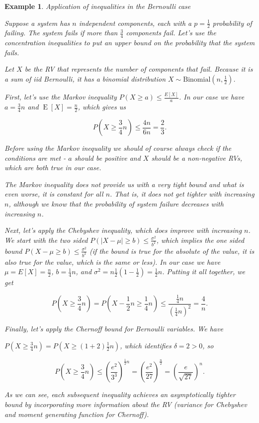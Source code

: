 \documentclass{book}
\theoremstyle{plain}%
\newtheorem{prototheorem}{Example}[section]
\newenvironment{cexample}
   {\colorlet{shadecolor}{gray!10}\begin{shaded}\begin{prototheorem}}
   {\end{prototheorem}\end{shaded}}
\theoremstyle{definition}
\DeclareMathOperator{\E}{E}
\begin{document}
\begin{cexample}{Application of inequalities in the Bernoulli case}

Suppose a system has $n$ independent components, each with a $p = \frac{1}{2}$ probability of failing. The system fails if more than $\frac{3}{4}$ components fail. Let's use the concentration inequalities to put an upper bound on the probability that the system fails.

Let $X$ be the RV that represents the number of components that fail. Because it is a sum of iid Bernoulli, it has a binomial distribution $X \sim \text{Binomial}(n, \frac{1}{2})$.

First, let's use the Markov inequality $P(X \geq a) \leq \frac{E[X]}{a}$. In our case we have $a = \frac{3}{4}n$ and $\E[X] = \frac{n}{2}$, which gives us

$$P(X \geq \frac{3}{4}n) \leq \frac{4n}{6n} = \frac{2}{3}.$$

Before using the Markov inequality we should of course always check if the conditions are met - $a$ should be positive and $X$ should be a non-negative RVs, which are both true in our case.

The Markov inequality does not provide us with a very tight bound and what is even worse, it is constant for all $n$. That is, it does not get tighter with increasing $n$, although we know that the probability of system failure decreases with increasing $n$.

Next, let's apply the Chebyshev inequality, which does improve with increasing $n$. We start with the two sided $P(|X - \mu| \geq b) \leq \frac{\sigma^2}{b^2}$, which implies the one sided bound $P(X - \mu \geq b) \leq \frac{\sigma^2}{b^2}$ (if the bound is true for the absolute of the value, it is also true for the value, which is the same or less). In our case we have $\mu = E[X] = \frac{n}{2}$, $b = \frac{1}{4}n$, and $\sigma^2 = n\frac{1}{2}(1 - \frac{1}{2}) = \frac{1}{2}n$. Putting it all together, we get

$$P(X \geq \frac{3}{4}n) = P(X - \frac{1}{2}n \geq \frac{1}{4}n) \leq \frac{\frac{1}{4}n}{(\frac{1}{4}n)^2} = \frac{4}{n}.$$

Finally, let's apply the Chernoff bound for Bernoulli variables. We have

$P(X \geq \frac{3}{4}n) = P(X \geq (1 + 2)\frac{1}{2}n)$, which identifies $\delta = 2 > 0$, so

$$P(X \geq \frac{3}{4}n) \leq \left(\frac{e^2}{3^3}\right)^{\frac{1}{2}n} = \left(\frac{e^2}{27}\right)^{\frac{n}{2}} = \left(\frac{e}{\sqrt{27}}\right)^n.$$

As we can see, each subsequent inequality achieves an asymptotically tighter bound by incorporating more information about the RV (variance for Chebyshev and moment generating function for Chernoff).
\label{ex:ineq_binom}
\end{cexample}
\end{document}
